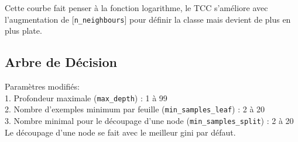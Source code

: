 \documentclass[10pt,letterpaper]{article}
\begin{document}
Cette courbe fait penser à la fonction logarithme, le TCC s’améliore avec l’augmentation de [\verb!n_neighbours!] pour définir la classe mais devient de plus en plus plate.

\subsection*{Arbre de Décision}
Paramètres modifiés:\\
1. Profondeur maximale (\verb!max_depth!) : 1 à 99\\
2. Nombre d’exemples minimum par feuille (\verb!min_samples_leaf!) : 2 à 20\\
3. Nombre minimal pour le découpage d’une node (\verb!min_samples_split!) : 2 à 20\\

\vspace{2mm}
Le découpage d’une node se fait avec le meilleur gini par défaut.
\end{document}
